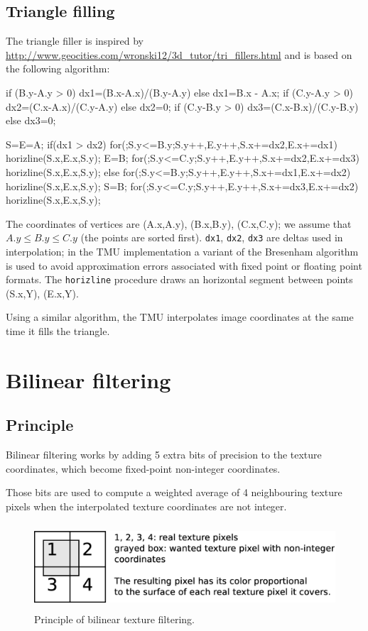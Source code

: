 \documentclass[a4paper,11pt]{article}
\begin{document}
\subsection{Triangle filling}
The triangle filler is inspired by \url{http://www.geocities.com/wronski12/3d_tutor/tri_fillers.html} and is based on the following algorithm:
\begin{verbatimtab}
if (B.y-A.y > 0) dx1=(B.x-A.x)/(B.y-A.y) else dx1=B.x - A.x;
if (C.y-A.y > 0) dx2=(C.x-A.x)/(C.y-A.y) else dx2=0;
if (C.y-B.y > 0) dx3=(C.x-B.x)/(C.y-B.y) else dx3=0;

S=E=A;
if(dx1 > dx2) {
	for(;S.y<=B.y;S.y++,E.y++,S.x+=dx2,E.x+=dx1)
		horizline(S.x,E.x,S.y);
	E=B;
	for(;S.y<=C.y;S.y++,E.y++,S.x+=dx2,E.x+=dx3)
		horizline(S.x,E.x,S.y);
} else {
	for(;S.y<=B.y;S.y++,E.y++,S.x+=dx1,E.x+=dx2)
		horizline(S.x,E.x,S.y);
	S=B;
	for(;S.y<=C.y;S.y++,E.y++,S.x+=dx3,E.x+=dx2)
		horizline(S.x,E.x,S.y);
}
\end{verbatimtab}

The coordinates of vertices are (A.x,A.y), (B.x,B.y), (C.x,C.y); we assume that $A.y \leq B.y \leq C.y$ (the points are sorted first). \verb!dx1!, \verb!dx2!, \verb!dx3! are deltas used in interpolation; in the TMU implementation a variant of the Bresenham algorithm is used to avoid approximation errors associated with fixed point or floating point formats. The \verb!horizline! procedure draws an horizontal segment between points (S.x,Y), (E.x,Y).

Using a similar algorithm, the TMU interpolates image coordinates at the same time it fills the triangle.

\section{Bilinear filtering}
\subsection{Principle}
Bilinear filtering works by adding 5 extra bits of precision to the texture coordinates, which become fixed-point non-integer coordinates.

Those bits are used to compute a weighted average of 4 neighbouring texture pixels when the interpolated texture coordinates are not integer.

\begin{figure}[H]
\centering
\includegraphics[height=32mm]{bilinear.eps}
\caption{Principle of bilinear texture filtering.}\label{fig:bilinear}
\end{figure}
\end{document}
